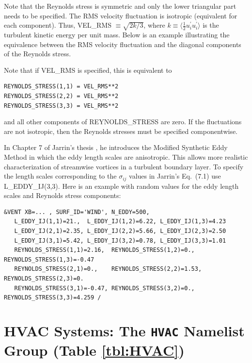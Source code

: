 \documentclass[11pt]{book}
\begin{document}
Note that the Reynolds stress is symmetric and only the lower triangular part needs to be specified.  The RMS velocity fluctuation is isotropic (equivalent for each component). Thus, {\ct VEL\_RMS} $\equiv \sqrt{2k/3}$, where $k\equiv \langle\frac{1}{2}u_i^\prime u_i^\prime\rangle$ is the turbulent kinetic energy per unit mass. Below is an example illustrating the equivalence between the RMS velocity fluctuation and the diagonal components of the Reynolds stress.

\noindent Note that if {\ct VEL\_RMS} is specified, this is equivalent to

\begin{lstlisting}
REYNOLDS_STRESS(1,1) = VEL_RMS**2
REYNOLDS_STRESS(2,2) = VEL_RMS**2
REYNOLDS_STRESS(3,3) = VEL_RMS**2
\end{lstlisting}

\noindent and all other components of {\ct REYNOLDS\_STRESS} are zero. If the fluctuations are not isotropic, then the Reynolds stresses must be specified componentwise.

In Chapter 7 of Jarrin's thesis \cite{Jarrin:2008}, he introduces the Modified Synthetic Eddy Method in which the eddy length scales are anisotropic. This allows more realistic characterization of streamwise vortices in a turbulent boundary layer. To specify the length scales corresponding to the $\sigma_{ij}$ values in Jarrin's Eq.~(7.1) use {\ct L\_EDDY\_IJ(3,3)}.  Here is an example with random values for the eddy length scales and Reynolds stress components:

\begin{lstlisting}
&VENT XB=... , SURF_ID='WIND', N_EDDY=500,
   L_EDDY_IJ(1,1)=21.,  L_EDDY_IJ(1,2)=6.22, L_EDDY_IJ(1,3)=4.23
   L_EDDY_IJ(2,1)=2.35, L_EDDY_IJ(2,2)=5.66, L_EDDY_IJ(2,3)=2.50
   L_EDDY_IJ(3,1)=5.42, L_EDDY_IJ(3,2)=0.78, L_EDDY_IJ(3,3)=1.01
   REYNOLDS_STRESS(1,1)=2.16,  REYNOLDS_STRESS(1,2)=0.,   REYNOLDS_STRESS(1,3)=-0.47
   REYNOLDS_STRESS(2,1)=0.,    REYNOLDS_STRESS(2,2)=1.53, REYNOLDS_STRESS(2,3)=0.
   REYNOLDS_STRESS(3,1)=-0.47, REYNOLDS_STRESS(3,2)=0.,   REYNOLDS_STRESS(3,3)=4.259 /
\end{lstlisting}






\section{HVAC Systems: The \texorpdfstring{{\tt HVAC}}{HVAC} Namelist Group (Table \ref{tbl:HVAC})}
\label{info:HVAC}
\end{document}
